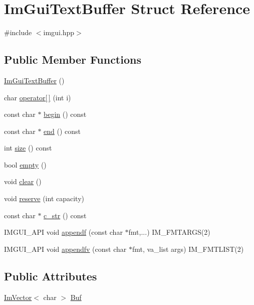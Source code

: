 \hypertarget{struct_im_gui_text_buffer}{}\section{Im\+Gui\+Text\+Buffer Struct Reference}
\label{struct_im_gui_text_buffer}


{\ttfamily \#include $<$imgui.\+hpp$>$}

\subsection*{Public Member Functions}
\begin{DoxyCompactItemize}
\item 
\hyperlink{struct_im_gui_text_buffer_a4c4369c5e65f591554428b947c498d0d}{Im\+Gui\+Text\+Buffer} ()
\item 
char \hyperlink{struct_im_gui_text_buffer_a8550f53463fd12711e3d08b740227bd4}{operator\mbox{[}$\,$\mbox{]}} (int i)
\item 
const char $\ast$ \hyperlink{struct_im_gui_text_buffer_aab6d83c6b9a8061287a4cb6135c1cab4}{begin} () const
\item 
const char $\ast$ \hyperlink{struct_im_gui_text_buffer_a2fc30ad0d384f98dfcea722f798d91f2}{end} () const
\item 
int \hyperlink{struct_im_gui_text_buffer_a2811fcd43e0224eb3bd0f3464b634289}{size} () const
\item 
bool \hyperlink{struct_im_gui_text_buffer_afdef38ae725bb5495f0143170fa902c8}{empty} ()
\item 
void \hyperlink{struct_im_gui_text_buffer_a9e4edc9f950bc9e35d5c3b3071dbc0df}{clear} ()
\item 
void \hyperlink{struct_im_gui_text_buffer_a3271f361e0f1997f4c3eb77665fdf161}{reserve} (int capacity)
\item 
const char $\ast$ \hyperlink{struct_im_gui_text_buffer_afb03439bc91723e274bfb9d247a691b9}{c\+\_\+str} () const
\item 
I\+M\+G\+U\+I\+\_\+\+A\+PI void \hyperlink{struct_im_gui_text_buffer_a1c5892db030c5364823793f472754c9e}{appendf} (const char $\ast$fmt,...) I\+M\+\_\+\+F\+M\+T\+A\+R\+GS(2)
\item 
I\+M\+G\+U\+I\+\_\+\+A\+PI void \hyperlink{struct_im_gui_text_buffer_ac8a6b11834c4cee8113bf6950e66112e}{appendfv} (const char $\ast$fmt, va\+\_\+list args) I\+M\+\_\+\+F\+M\+T\+L\+I\+ST(2)
\end{DoxyCompactItemize}
\subsection*{Public Attributes}
\begin{DoxyCompactItemize}
\item 
\hyperlink{class_im_vector}{Im\+Vector}$<$ char $>$ \hyperlink{struct_im_gui_text_buffer_aa6de034b1920cdae5505cc58abf14240}{Buf}
\end{DoxyCompactItemize}


